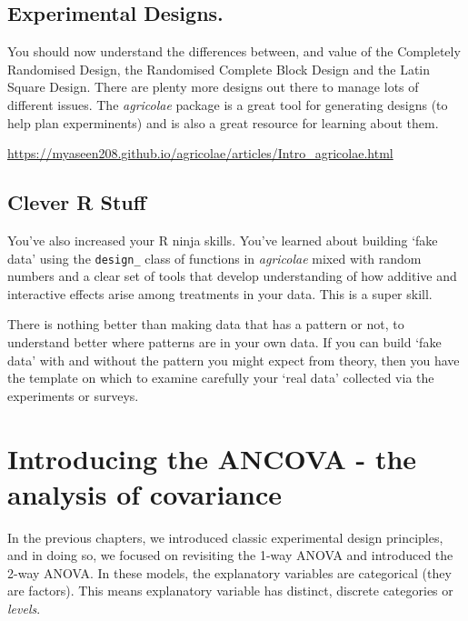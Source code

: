 \documentclass[
]{book}
\begin{document}
\hypertarget{experimental-designs.}{%
\section{Experimental Designs.}\label{experimental-designs.}}

You should now understand the differences between, and value of the Completely Randomised Design, the Randomised Complete Block Design and the Latin Square Design. There are plenty more designs out there to manage lots of different issues. The \emph{agricolae} package is a great tool for generating designs (to help plan experminents) and is also a great resource for learning about them.

\url{https://myaseen208.github.io/agricolae/articles/Intro_agricolae.html}

\hypertarget{clever-r-stuff}{%
\section{Clever R Stuff}\label{clever-r-stuff}}

You've also increased your R ninja skills. You've learned about building `fake data' using the \texttt{design\_} class of functions in \emph{agricolae} mixed with random numbers and a clear set of tools that develop understanding of how additive and interactive effects arise among treatments in your data. This is a super skill.

There is nothing better than making data that has a pattern or not, to understand better where patterns are in your own data. If you can build `fake data' with and without the pattern you might expect from theory, then you have the template on which to examine carefully your `real data' collected via the experiments or surveys.

\hypertarget{introducing-the-ancova---the-analysis-of-covariance}{%
\chapter{Introducing the ANCOVA - the analysis of covariance}\label{introducing-the-ancova---the-analysis-of-covariance}}

In the previous chapters, we introduced classic experimental design principles, and in doing so, we focused on revisiting the 1-way ANOVA and introduced the 2-way ANOVA. In these models, the explanatory variables are categorical (they are factors). This means explanatory variable has distinct, discrete categories or \emph{levels}.
\end{document}

